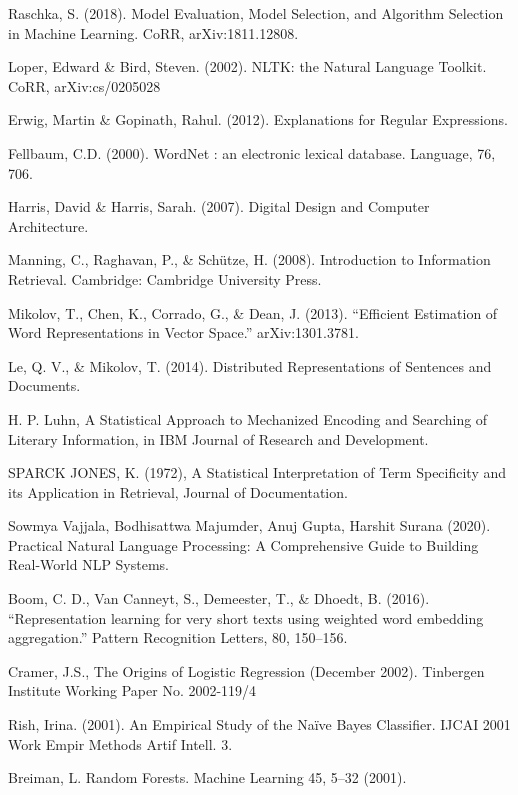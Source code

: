 \documentclass[runningheads]{llncs}
\begin{document}
\begin{thebibliography}{8}
Raschka, S. (2018). Model Evaluation, Model Selection, and Algorithm Selection in Machine Learning. CoRR, arXiv:1811.12808.

Loper, Edward \& Bird, Steven. (2002). NLTK: the Natural Language Toolkit. CoRR, arXiv:cs/0205028

Erwig, Martin \& Gopinath, Rahul. (2012). Explanations for Regular Expressions.

Fellbaum, C.D. (2000). WordNet : an electronic lexical database. Language, 76, 706.

Harris, David \& Harris, Sarah. (2007). Digital Design and Computer Architecture. 

Manning, C., Raghavan, P., \& Schütze, H. (2008). Introduction to Information Retrieval. Cambridge: Cambridge University Press.

Mikolov, T., Chen, K., Corrado, G., \& Dean, J. (2013). “Efficient Estimation of Word Representations in Vector Space.” arXiv:1301.3781.

Le, Q. V., \& Mikolov, T. (2014). Distributed Representations of Sentences and Documents.

H. P. Luhn, A Statistical Approach to Mechanized Encoding and Searching of Literary Information, in IBM Journal of Research and Development.

SPARCK JONES, K. (1972), A Statistical Interpretation of Term Specificity and its Application in Retrieval, Journal of Documentation.

Sowmya Vajjala, Bodhisattwa Majumder, Anuj Gupta, Harshit Surana (2020). Practical Natural Language Processing: A Comprehensive Guide to Building Real-World NLP Systems.

Boom, C. D., Van Canneyt, S., Demeester, T., \& Dhoedt, B. (2016). “Representation learning for very short texts using weighted word embedding aggregation.” Pattern Recognition Letters, 80, 150–156.

Cramer, J.S., The Origins of Logistic Regression (December 2002). Tinbergen Institute Working Paper No. 2002-119/4

Rish, Irina. (2001). An Empirical Study of the Naïve Bayes Classifier. IJCAI 2001 Work Empir Methods Artif Intell. 3.

Breiman, L. Random Forests. Machine Learning 45, 5–32 (2001).


\end{thebibliography}
\end{document}
